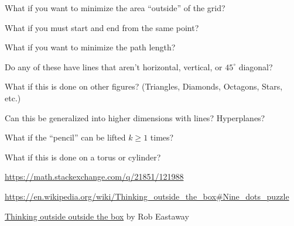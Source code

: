 \documentclass{article}
\begin{document}
\begin{related}
  \item What if you want to minimize the area ``outside'' of the grid?
  \item What if you must start and end from the same point?
  \item What if you want to minimize the path length?
  \item Do any of these have lines that aren't horizontal, vertical, or $45^\circ$ diagonal?
  \item What if this is done on other figures? (Triangles, Diamonds, Octagons, Stars, etc.)
  \item Can this be generalized into higher dimensions with lines? Hyperplanes?
  \item What if the ``pencil'' can be lifted $k \geq 1$ times?
  \item What if this is done on a torus or cylinder?
\end{related}
\begin{references}
  \item \url{https://math.stackexchange.com/q/21851/121988}
  \item \url{https://en.wikipedia.org/wiki/Thinking_outside_the_box#Nine_dots_puzzle}
  \item \href{https://chalkdustmagazine.com/features/thinking-outside-outside-box/}{Thinking outside outside the box} by Rob Eastaway
\end{references}
\end{document}
